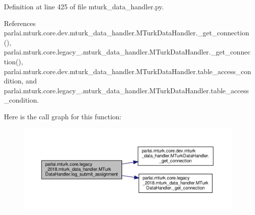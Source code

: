 Definition at line 425 of file mturk\+\_\+data\+\_\+handler.\+py.



References parlai.\+mturk.\+core.\+dev.\+mturk\+\_\+data\+\_\+handler.\+M\+Turk\+Data\+Handler.\+\_\+get\+\_\+connection(), parlai.\+mturk.\+core.\+legacy\+\_.\+mturk\+\_\+data\+\_\+handler.\+M\+Turk\+Data\+Handler.\+\_\+get\+\_\+connection(), parlai.\+mturk.\+core.\+dev.\+mturk\+\_\+data\+\_\+handler.\+M\+Turk\+Data\+Handler.\+table\+\_\+access\+\_\+condition, and parlai.\+mturk.\+core.\+legacy\+\_.\+mturk\+\_\+data\+\_\+handler.\+M\+Turk\+Data\+Handler.\+table\+\_\+access\+\_\+condition.

Here is the call graph for this function\+:
\nopagebreak
\begin{figure}[H]
\begin{center}
\leavevmode
\includegraphics[width=350pt]{classparlai_1_1mturk_1_1core_1_1legacy__2018_1_1mturk__data__handler_1_1MTurkDataHandler_a003f7a51af6ded2072ad521bf7acf0cb_cgraph}
\end{center}
\end{figure}
\mbox{\label{classparlai_1_1mturk_1_1core_1_1legacy__2018_1_1mturk__data__handler_1_1MTurkDataHandler_ac38ddedd0a8efa4e833a502e8d2860c6}} 
